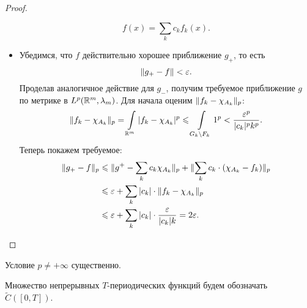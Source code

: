 \begin{proof}
\begin{itemize}
            \[
                f(x) = \sum_k{c_k f_k(x)}
            .\]
        \item Убедимся, что $f$ действительно хорошее приближение $g_+$, то есть
            \[
                \lVert g_+ - f\rVert < \varepsilon
            .\]
            Проделав аналогичное действие для $g_-$, получим требуемое приближение
            $g$ по метрике в $L^p(\mathbb{R}^m, \lambda_m)$. Для начала оценим 
            $\lVert f_k - \chi_{A_k}\rVert_p$:
            \[
                \lVert f_k - \chi_{A_k}\rVert_p = \int\limits_{\mathbb{R}^m}{|f_k - \chi_{A_k}|^p}
                \leqslant \int\limits_{G_k \setminus F_k}{1^p} < \frac{\varepsilon^p}{|c_k|^p k^p}
            .\]
            Теперь покажем требуемое:
            \begin{align*}
                \lVert g_+ - f\rVert_p 
                &\leqslant \lVert g^+ - \sum_k{c_k \chi_{A_k}}\rVert_p
                + \lVert\sum_k{c_k \cdot (\chi_{A_k} - f_k)}\rVert_p \\
                &\leqslant \varepsilon + \sum_k{|c_k| \cdot \lVert f_k - \chi_{A_k}\rVert_p} \\
                &\leqslant \varepsilon + \sum_k{|c_k| \cdot \frac{\varepsilon}{|c_k| k}} = 2\varepsilon
            .\end{align*}
    \end{itemize}
\end{proof}

\begin{remark}
    Условие $p \neq +\infty$ существенно.
\end{remark}

\begin{definition}
    Множество непрерывных $T$-периодических функций будем обозначать $\widetilde{C}([0, T])$.
\end{definition}

